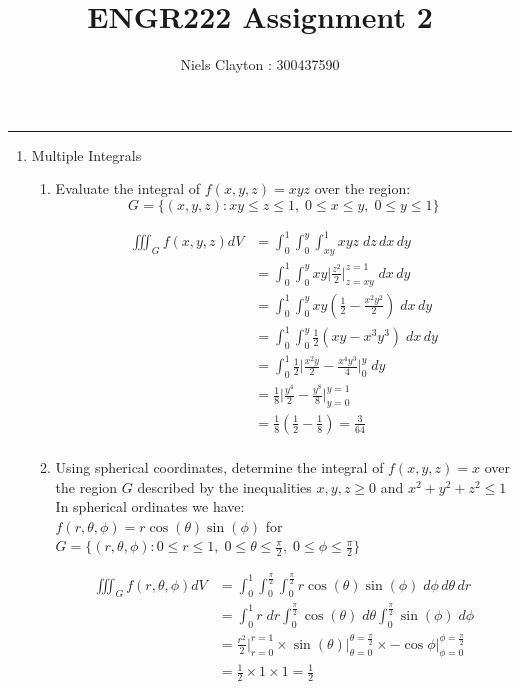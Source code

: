 \documentclass[a4paper,11pt]{article}
\begin{document}
\begin{preview}
\title{\LARGE{\textbf{ENGR222 Assignment 2}}}
\author{Niels Clayton : 300437590}
\date{}
\maketitle
\hrule

\begin{enumerate}
\item Multiple Integrals 

\begin{enumerate}
    \item Evaluate the integral of $f (x, y, z) = xyz$ over the region:
    $$ G = \{ (x,y,z):xy \leq z \leq 1, \; 0 \leq x \leq y, \; 0 \leq y \leq 1 \} $$

    \begin{align*}
        \iiint_G f(x,y,z)dV &= \int_{0}^{1} \int_{0}^{y} \int_{xy}^{1} xyz\; dz\,dx\,dy\\
        &= \int_{0}^{1} \int_{0}^{y} xy \Big|\frac{z^2}{2}\Big|_{z=xy}^{z = 1}\;dx\,dy\\
        &= \int_{0}^{1} \int_{0}^{y} xy \left( \frac{1}{2} - \frac{x^2y^2}{2} \right)\;dx\,dy\\
        &= \int_{0}^{1} \int_{0}^{y} \frac{1}{2} (xy - x^3y^3) \;dx\,dy\\
        &= \int_{0}^{1} \frac{1}{2} \Big| \frac{x^2 y}{2} - \frac{x^4y^3}{4} \Big|_{0}^{y} \;dy\\
        &= \frac{1}{8} \Big| \frac{y^4}{2} - \frac{y^8}{8}\Big|_{y = 0}^{y = 1}\\
        &= \frac{1}{8} \left( \frac{1}{2} - \frac{1}{8}\right) = \frac{3}{64} \\
    \end{align*}

    \item Using spherical coordinates, determine the integral of $f (x,y,z)= x$ over the region $G$ described by the inequalities $ x,y,z \geq 0 $ and $ x^2 + y^2 + z^2 \leq 1 $\\
    
    In spherical ordinates we have: \\$ f(r, \theta, \phi) = r\cos(\theta) \sin(\phi) $ for $G = \{ (r, \theta, \phi): 0 \leq r \leq 1, \; 0 \leq \theta \leq \frac{\pi}{2}, \; 0 \leq \phi \leq \frac{\pi}{2} \}$

    \begin{align*}
        \iiint_G f(r, \theta, \phi)dV &= \int_{0}^{1} \int_{0}^{\frac{\pi}{2}} \int_{0}^{\frac{\pi}{2}} r\cos(\theta) \sin(\phi) \; d\phi\,d\theta\,dr\\
        &= \int_{0}^{1} r \; dr \int_{0}^{\frac{\pi}{2}} \cos(\theta) \;d\theta \int_{0}^{\frac{\pi}{2}} \sin(\phi) \; d\phi\\
        &= \frac{r^2}{2}\Big|_{r=0}^{r=1} \times \sin(\theta)\Big|_{\theta = 0}^{\theta = \frac{\pi}{2}} \times -\cos\phi\Big|_{\phi=0}^{\phi=\frac{\pi}{2}}\\
        &= \frac{1}{2} \times 1 \times 1 = \frac{1}{2}
    \end{align*}


\end{enumerate}
\end{enumerate}
\end{preview}
\end{document}
